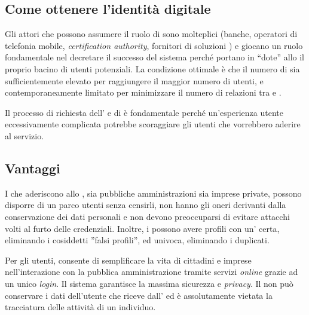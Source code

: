 \subsection{Come ottenere l'identità digitale}
Gli attori che possono assumere il ruolo di  sono molteplici (banche, operatori di telefonia mobile, \textit{certification authority}, fornitori di soluzioni ) e giocano un ruolo fondamentale nel decretare il successo del sistema perché portano in “dote” allo  il proprio bacino di utenti potenziali. La condizione ottimale è che il numero di  sia sufficientemente elevato per raggiungere il maggior numero di utenti, e contemporaneamente limitato per minimizzare il numero di relazioni tra  e . 

Il processo di richiesta  dell' e di  è fondamentale perché un'esperienza utente eccessivamente complicata potrebbe scoraggiare gli utenti che vorrebbero aderire al servizio.

\subsection{Vantaggi}
I  che aderiscono allo , sia pubbliche amministrazioni sia imprese private, possono disporre di un parco utenti senza censirli, non hanno gli oneri derivanti dalla conservazione dei dati personali e non devono preoccuparsi di evitare attacchi volti al furto delle credenziali. Inoltre, i  possono avere profili con un’ certa, eliminando i cosiddetti ''falsi profili'', ed univoca, eliminando i duplicati.

Per gli utenti,  consente di semplificare la vita di cittadini e imprese nell'interazione con la pubblica amministrazione tramite servizi \textit{online} grazie ad un unico \textit{login}. Il sistema garantisce la massima sicurezza e \textit{privacy}. Il  non può conservare i dati dell'utente che riceve dall’ ed è assolutamente vietata la tracciatura delle attività di un individuo.